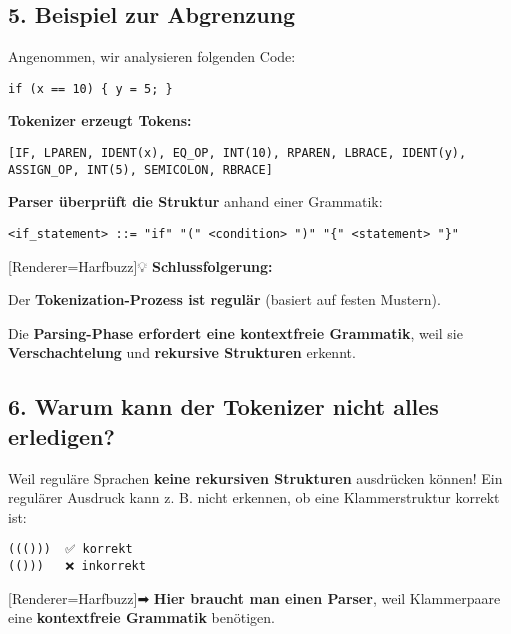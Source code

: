 \documentclass[a4paper]{article}
\newcommand{\uliji}[1]{
  {\setmainfont{Noto Color Emoji}[Renderer=Harfbuzz]{#1}}
}
\begin{document}
\subsection*{5. Beispiel zur Abgrenzung}
Angenommen, wir analysieren folgenden Code:

\begin{verbatim}
if (x == 10) { y = 5; }
\end{verbatim}
\begin{itemize}
  \begin{item}
    \textbf{Tokenizer erzeugt Tokens:}

\begin{verbatim}
[IF, LPAREN, IDENT(x), EQ_OP, INT(10), RPAREN, LBRACE, IDENT(y), ASSIGN_OP, INT(5), SEMICOLON, RBRACE]
\end{verbatim}
  \end{item}
  \begin{item}
    \textbf{Parser überprüft die Struktur} anhand einer Grammatik:

\begin{verbatim}
<if_statement> ::= "if" "(" <condition> ")" "{" <statement> "}"
\end{verbatim}
  \end{item}
\end{itemize}
\uliji{💡} \textbf{Schlussfolgerung:}
\begin{itemize}
  \begin{item}
    Der \textbf{Tokenization-Prozess ist regulär} (basiert auf festen Mustern).
  \end{item}
  \begin{item}
    Die \textbf{Parsing-Phase erfordert eine kontextfreie Grammatik}, weil sie \textbf{Verschachtelung} und \textbf{rekursive Strukturen} erkennt.
  \end{item}
\end{itemize}
\subsection*{6. Warum kann der Tokenizer nicht alles erledigen?}
Weil reguläre Sprachen \textbf{keine rekursiven Strukturen} ausdrücken können! Ein regulärer Ausdruck kann z. B. nicht erkennen, ob eine Klammerstruktur korrekt ist:

\begin{verbatim}
((()))  ✅ korrekt
(()))   ❌ inkorrekt
\end{verbatim}
\uliji{➡} \textbf{Hier braucht man einen Parser}, weil Klammerpaare eine \textbf{kontextfreie Grammatik} benötigen.
\end{document}
